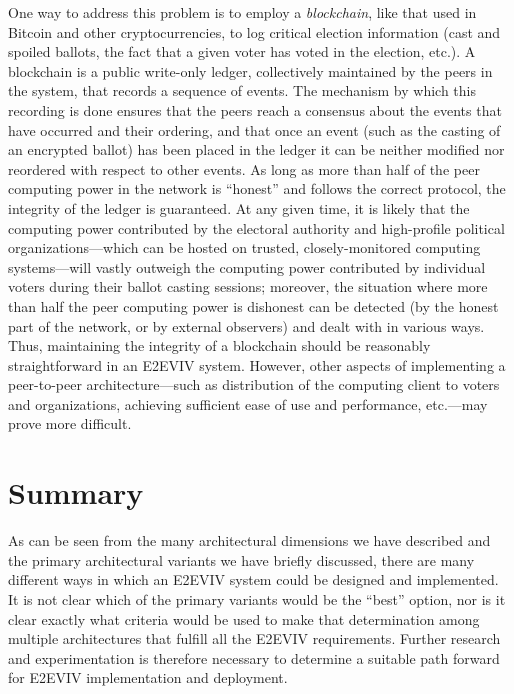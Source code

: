 One way to address this problem is to employ a \emph{blockchain}, like
that used in Bitcoin and other cryptocurrencies, to log critical
election information (cast and spoiled ballots, the fact that a given
voter has voted in the election, etc.). A blockchain is a public
write-only ledger, collectively maintained by the peers in the system,
that records a sequence of events. The mechanism by which this
recording is done ensures that the peers reach a consensus about the
events that have occurred and their ordering, and that once an event
(such as the casting of an encrypted ballot) has been placed in the
ledger it can be neither modified nor reordered with respect to other
events. As long as more than half of the peer computing power in the
network is ``honest'' and follows the correct protocol, the integrity
of the ledger is guaranteed. At any given time, it is likely that the
computing power contributed by the electoral authority and
high-profile political organizations---which can be hosted on trusted,
closely-monitored computing systems---will vastly outweigh the
computing power contributed by individual voters during their ballot
casting sessions; moreover, the situation where more than half the
peer computing power is dishonest can be detected (by the honest part
of the network, or by external observers) and dealt with in various
ways. Thus, maintaining the integrity of a blockchain should be
reasonably straightforward in an E2EVIV system. However, other aspects
of implementing a peer-to-peer architecture---such as distribution of
the computing client to voters and organizations, achieving sufficient
ease of use and performance, etc.---may prove more difficult.

\section{Summary}

As can be seen from the many architectural dimensions we have
described and the primary architectural variants we have briefly
discussed, there are many different ways in which an E2EVIV system
could be designed and implemented. It is not clear which of the
primary variants would be the ``best'' option, nor is it clear exactly
what criteria would be used to make that determination among multiple
architectures that fulfill all the E2EVIV requirements. Further
research and experimentation is therefore necessary to determine a
suitable path forward for E2EVIV implementation and deployment.

